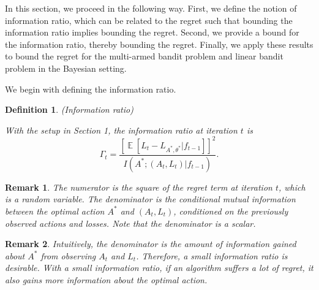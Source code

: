 \documentclass[11pt]{article}
\newtheorem{definition}{Definition}[section]
\newtheorem{remark}{Remark}[theorem]
\DeclareMathOperator*{\E}{\mathbb{E}}
\begin{document}
In this section, we proceed in the following way. First, we define the notion of information ratio, which can be related to the regret such that bounding the information ratio implies bounding the regret. Second, we provide a bound for the information ratio, thereby bounding the regret. Finally, we apply these results to bound the regret for the multi-armed bandit problem and linear bandit problem in the Bayesian setting.

We begin with defining the information ratio.
\begin{definition}
(Information ratio)

With the setup in Section 1, the information ratio at iteration $t$ is
\begin{equation*}
    \Gamma_t = \frac{[\E[L_t - L_{A^*, \theta^*} | f_{t-1}]]^2}{I(A^*;(A_t, L_t)|f_{t-1})}.
\end{equation*}
\end{definition}

\begin{remark}
The numerator is the square of the regret term at iteration $t$, which is a random variable. The denominator is the conditional mutual information between the optimal action $A^*$ and $(A_t, L_t)$, conditioned on the previously observed actions and losses. Note that the denominator is a scalar.
\end{remark}

\begin{remark}
Intuitively, the denominator is the amount of information gained about $A^*$ from observing $A_t$ and $L_t$. Therefore, a small information ratio is desirable. With a small information ratio, if an algorithm suffers a lot of regret, it also gains more information about the optimal action.
\end{remark}
\end{document}
